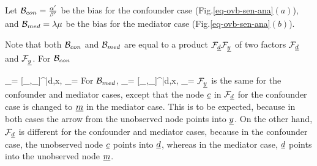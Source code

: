 Let ${\cal B}_{con}=\frac{\alpha'}{\beta'}$
be the bias
 for the confounder case
(Fig.\ref{eq-ovb-sen-ana}$(a)$), and 
${\cal B}_{med}=\lambda\mu$ be the bias for the mediator case
(Fig.\ref{eq-ovb-sen-ana}$(b)$).

Note that both ${\cal B}_{con}$ and ${\cal B}_{med}$
are equal to a product 
${\cal F}_{\underline{d}}{\cal F}_{\underline{y}}$ of two
factors ${\cal F}_{\underline{d}}$ and ${\cal F}_{\underline{y}}$.
For ${\cal B}_{con}$

\beq
\calf_\rvy = [\rho_{\rvy,\rvc}\s_\rvy]^{|d,x},
\quad \calf_\rvd =
\eeq
For ${\cal B}_{med}$, 
\beq
\calf_\rvy = [\rho_{\rvy,\rvm}\s_\rvy]^{|d,x},
\quad
\calf_\rvd =
\eeq
${\cal F}_{\underline{y}}$ is the same
for the confounder and mediator cases, except that the node ${\underline{c}}$ in ${\cal F}_{\underline{d}}$ 
for the confounder case is changed to ${\underline{m}}$ in the mediator case. This is to be expected, because 
in both cases the arrow from
the unobserved node points into
${\underline{y}}$.
On the other hand,
${\cal F}_{\underline{d}}$ is different
for the confounder and mediator cases,
because in the confounder case, the unobserved node ${\underline{c}}$ points into ${\underline{d}}$,
whereas  in the mediator case,
${\underline{d}}$ points into the unobserved node ${\underline{m}}$.



